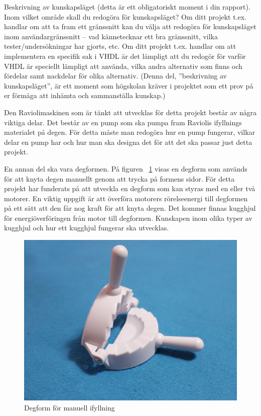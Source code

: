Beskrivning av kunskapsläget (detta är ett obligatoriskt moment i din rapport). Inom vilket område skall du redogöra för kunskapsläget? Om ditt projekt t.ex. handlar om att ta fram ett gränssnitt kan du välja att redogöra för kunskapsläget inom användargränssnitt – vad kännetecknar ett bra gränssnitt, vilka tester/undersökningar har gjorts, etc. Om ditt projekt t.ex. handlar om att implementera en specifik sak i VHDL är det lämpligt att du redogör för varför VHDL är speciellt lämpligt att använda, vilka andra alternativ som finns och fördelar samt nackdelar för olika alternativ. (Denna del, ”beskrivning av kunskapsläget”, är ett moment som högskolan kräver i projektet som ett prov på er förmåga att inhämta och sammanställa kunskap.)\medskip
 
Den Raviolimaskinen som är tänkt att utvecklas för detta projekt består av några viktiga delar. Det består av en pump som ska pumpa fram Raviolis ifyllnings materialet på degen. För detta måste man redogöra hur en pump fungerar, vilkar delar en pump har och hur man ska designa det för att det ska passar just detta projekt.\medskip

En annan del ska vara degformen. På figuren ~\ref{degfrom} visas en degform som används för att knyta degen manuellt genom att trycka på formens sidor. För detta projekt har funderats på att utveckla en degform som kan styras med en eller två motorer. En viktig uppgift är att överföra motorers rörelseenergi till degformen på ett sätt att den får nog kraft för att knyta degen. Det kommer finnas kugghjul för energiöverföringen från motor till degformen. Kunskapen inom olika typer av kugghjul och hur ett kugghjul fungerar ska utvecklas.\medskip

\begin{figure}[h]
	\begin{center}
		\includegraphics[scale=0.08] {images/degform.jpg}
		\caption{Degform för manuell ifyllning}
		\label{degfrom}	
	\end{center}
\end{figure}\medskip

